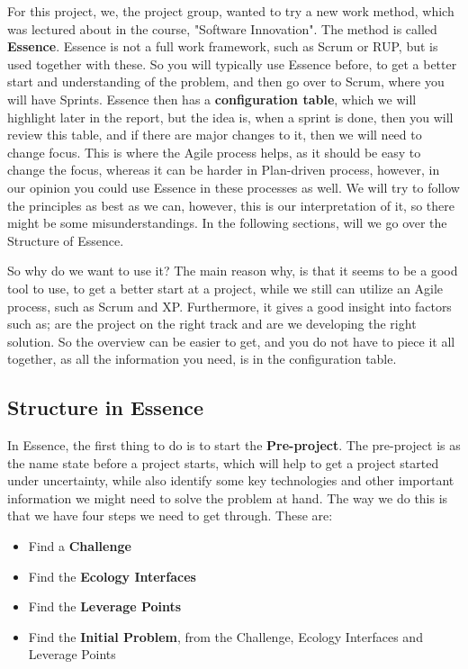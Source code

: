 For this project, we, the project group, wanted to try a new work method, which was lectured about in the course, "Software Innovation".
The method is called \textbf{Essence}.
Essence is not a full work framework, such as Scrum or RUP, but is used together with these.
So you will typically use Essence before, to get a better start and understanding of the problem, and then go over to Scrum, where you will have Sprints. 
Essence then has a \textbf{configuration table}, which we will highlight later in the report, but the idea is, when a sprint is done, then you will review this table, and if there are major changes to it, then we will need to change focus.
This is where the Agile process helps, as it should be easy to change the focus, whereas it can be harder in Plan-driven process, however, in our opinion you could use Essence in these processes as well. 
We will try to follow the principles as best as we can, however, this is our interpretation of it, so there might be some misunderstandings.
In the following sections, will we go over the Structure of Essence.

So why do we want to use it?
The main reason why, is that it seems to be a good tool to use, to get a better start at a project, while we still can utilize an Agile process, such as Scrum and XP.
Furthermore, it gives a good insight into factors such as; are the project on the right track and are we developing the right solution.
So the overview can be easier to get, and you do not have to piece it all together, as all the information you need, is in the configuration table.

\subsection{Structure in Essence}
In Essence, the first thing to do is to start the \textbf{Pre-project}.
The pre-project is as the name state before a project starts, which will help to get a project started under uncertainty, while also identify some key technologies and other important information we might need to solve the problem at hand.
The way we do this is that we have four steps we need to get through.
These are:

\begin{itemize}
    \item Find a \textbf{Challenge}
    \item Find the \textbf{Ecology Interfaces}
    \item Find the \textbf{Leverage Points}
    \item Find the \textbf{Initial Problem}, from the Challenge, Ecology Interfaces and Leverage Points
\end{itemize}

